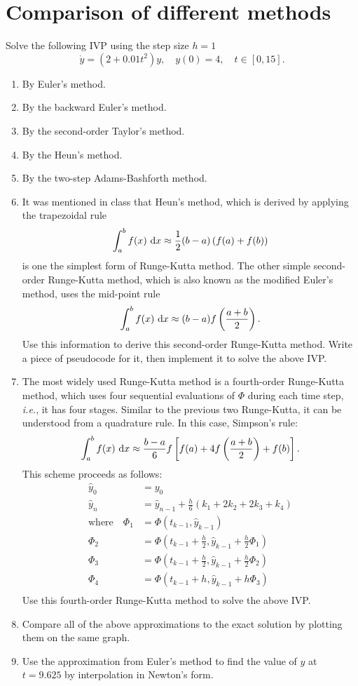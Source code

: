 \section{Comparison of different methods}
Solve the following IVP using the step size \(h = 1\)
\[ \dot{y}=\left(2+0.01t^2\right)y, \quad y(0)=4, \quad t\in[0,15]. \]
\begin{enumerate}
	\item By Euler's method.
	\item By the backward Euler's method.
	\item By the second-order Taylor's method.
	\item By the Heun's method.
	\item By the two-step Adams-Bashforth method.
	\item It was mentioned in class that Heun's method, which is derived by applying the trapezoidal rule
	\[ \int_{a}^{b}f(x)~\mathrm{d} x\approx\frac{1}{2}(b-a)\left(f(a)+f(b)\right) \]
	is one the simplest form of Runge-Kutta method.
	The other simple second-order Runge-Kutta method, which is also known as the modified Euler's method, uses the mid-point rule
	\[ \int_{a}^{b}f(x)~\mathrm{d} x\approx(b-a)f\left(\frac{a+b}{2}\right). \]
	Use this information to derive this second-order Runge-Kutta method.
	Write a piece of pseudocode for it, then implement it to solve the above IVP.
	\item The most widely used Runge-Kutta method is a fourth-order Runge-Kutta method, which uses four sequential evaluations of \(\Phi\) during each time step, \textit{i.e.}, it has four stages.
	Similar to the previous two Runge-Kutta, it can be understood from a quadrature rule.
	In this case, Simpson's rule:
	\[ \int_{a}^{b}f(x)~\mathrm{d} x\approx\frac{b-a}{6}f\left[f(a)+4f\left(\frac{a+b}{2}\right)+f(b)\right]. \]
	This scheme proceeds as follows:
	\begin{align*}
	\hat{y}_0&=y_0\\
	\hat{y}_n&=\hat{y}_{n-1}+\frac{h}{6}(k_1+2k_2+2k_3+k_4)\\
	\text{where} \quad \Phi_1&=\Phi(t_{k-1},\hat{y}_{k-1})\\
	\Phi_2&=\Phi\left(t_{k-1}+\frac{h}{2},\hat{y}_{k-1}+\frac{h}{2}\Phi_1\right)\\
	\Phi_3&=\Phi\left(t_{k-1}+\frac{h}{2},\hat{y}_{k-1}+\frac{h}{2}\Phi_2\right)\\
	\Phi_4&=\Phi\left(t_{k-1}+h,\hat{y}_{k-1}+h\Phi_3\right)\\
	\end{align*}
	Use this fourth-order Runge-Kutta method to solve the above IVP.
	\item Compare all of the above approximations to the exact solution by plotting them on the same graph.
	\item Use the approximation from Euler's method to find the value of \(y\) at \(t=9.625\) by interpolation in Newton's form.
\end{enumerate}
